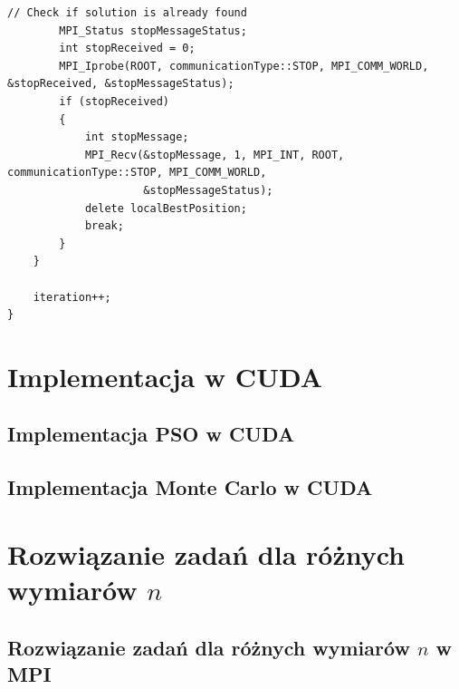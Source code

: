 \documentclass[11pt, a4paper, oneside]{article}
\begin{document}
\begin{lstlisting}[style=mycpp, label=code:pso_before, caption={Schemat komunikacji MPI w metodzie Monte Carlo.}]
        // Check if solution is already found
        MPI_Status stopMessageStatus;
        int stopReceived = 0;
        MPI_Iprobe(ROOT, communicationType::STOP, MPI_COMM_WORLD, &stopReceived, &stopMessageStatus);
        if (stopReceived)
        {
            int stopMessage;
            MPI_Recv(&stopMessage, 1, MPI_INT, ROOT, communicationType::STOP, MPI_COMM_WORLD,
                     &stopMessageStatus);
            delete localBestPosition;
            break;
        }
    }

    iteration++;
}
\end{lstlisting}
        
        
 \section{Implementacja w CUDA}

\subsection{Implementacja PSO w CUDA}

\subsection{Implementacja Monte Carlo w CUDA}

\section{Rozwiązanie zadań dla różnych wymiarów $n$}

\subsection{Rozwiązanie zadań dla różnych wymiarów $n$ w MPI}
\end{document}
